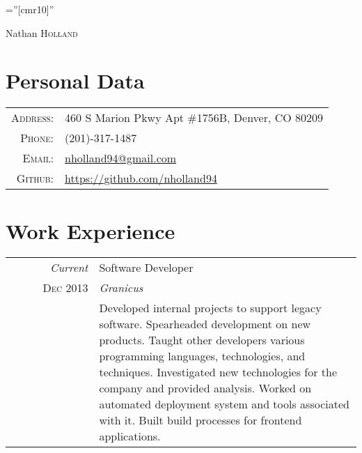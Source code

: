 \documentclass[a4paper,10pt]{article}
\begin{document}
\pagestyle{empty} %

\font\fb=''[cmr10]'' %

\par{\centering
		{\Huge Nathan \textsc{Holland}
	}\bigskip\par}

\section{Personal Data}
\begin{tabular}{rl}
  \textsc{Address:}   & 460 S Marion Pkwy Apt \#1756B, Denver, CO 80209 \\
  \textsc{Phone:}     & (201)-317-1487\\
  \textsc{Email:}     & \href{mailto:nholland94@gmail.com}{nholland94@gmail.com}\\
  \textsc{Github:}    & \href{https://github.com/nholland94}{https://github.com/nholland94}
\end{tabular}

\section{Work Experience}
\begin{tabular}{r|p{11cm}}
  \ \ \ \ \ \ \ \emph{Current} & Software Developer\\
  \textsc{Dec 2013}            & \emph{Granicus} \\
                               & \footnotesize{Developed internal projects to support legacy software. Spearheaded development on new products. Taught other developers various programming languages, technologies, and techniques. Investigated new technologies for the company and provided analysis. Worked on automated deployment system and tools associated with it. Built build processes for frontend applications.}\\
\end{tabular}
\end{document}
